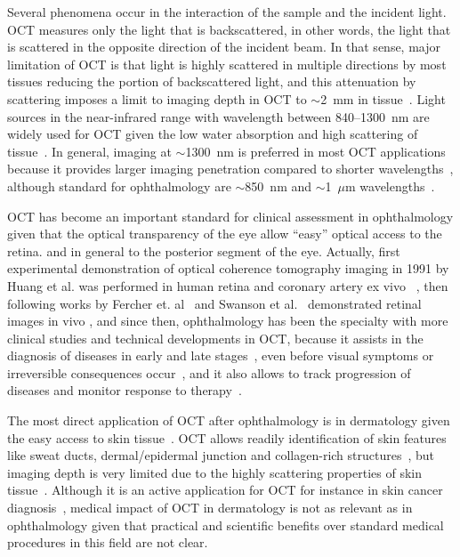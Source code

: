 Several phenomena occur in the interaction of the sample and the incident light. OCT measures only the light that is backscattered, in other words, the light that is scattered in the opposite direction of the incident beam. In that sense, major limitation of OCT is that light is highly scattered in multiple directions by most tissues reducing the portion of backscattered light, and this attenuation by scattering imposes a limit to imaging depth in OCT to $\sim$2~mm in tissue~\cite{Fujimoto2015_Introduction}. Light sources in the near-infrared range with wavelength between 840--1300~nm are widely used for OCT given the low water absorption and high scattering of tissue~\cite{Schmitt1994_Opticalcoherence}. In general, imaging at $\sim$1300~nm is preferred in most OCT applications because it provides larger imaging penetration compared to shorter wavelengths~\cite{}, although standard for ophthalmology are $\sim$850~nm and $\sim$1~$\mu$m wavelengths~\cite{Fujimoto2015_Introduction}.

OCT has become an important standard for clinical assessment in ophthalmology given that the optical transparency of the eye allow ``easy'' optical access to the retina. and in general to the posterior segment of the eye. Actually, first experimental demonstration of optical coherence tomography imaging in 1991 by Huang et al. was performed in human retina and coronary artery ex vivo ~\cite{Huang1991_Optical}, then following works by Fercher et. al~\cite{Fercher1993_Vivo} and Swanson et al.~\cite{Swanson1993_Vivo-1} demonstrated retinal images in vivo , and since then, ophthalmology has been the specialty with more clinical studies and technical developments in OCT, because it assists in the diagnosis of diseases in early and late stages~\cite{Puliafito1995_Imaging, Chu2007_Clinical, Sathyan2012_Optical}, even before visual symptoms or irreversible consequences occur~\cite{Schuman1995_Quantification}, and it also allows to track progression of diseases and monitor response to therapy~\cite{Carrasco-Zevallos2017_Review, Chang2018_Intelligent, Maltais-Tariant2020_Realtime}.

The most direct application of OCT after ophthalmology is in dermatology given the easy access to skin tissue~\cite{Welzel2001_Optical}. OCT allows readily identification of skin features like sweat ducts, dermal/epidermal junction and collagen-rich structures~\cite{Welzel1997_Optical}, but imaging depth is very limited due to the highly scattering properties of skin tissue~\cite{Carrion2007_Comparative}. Although it is an active application for OCT for instance in skin cancer diagnosis~\cite{FerrantediRuffano2018_Optical}, medical impact of OCT in dermatology is not as relevant as in ophthalmology given that practical and scientific benefits over standard medical procedures in this field are not clear.

